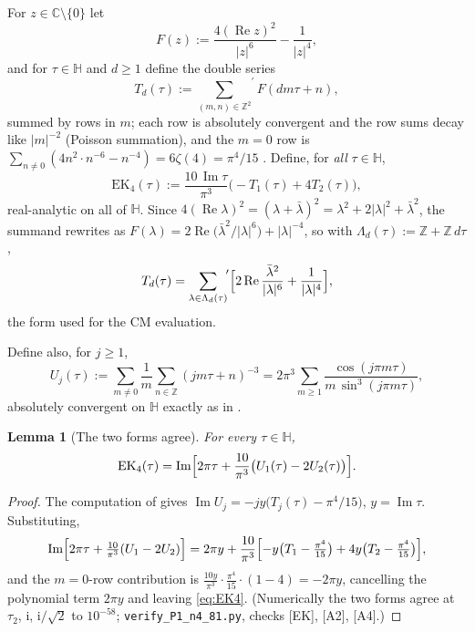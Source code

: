 \documentclass[11pt]{article}
\newtheorem{lemma}[theorem]{Lemma}
\theoremstyle{definition}
\theoremstyle{remark}
\newcommand{\Hh}{\mathbb{H}}
\newcommand{\Cc}{\mathbb{C}}
\newcommand{\Zz}{\mathbb{Z}}
\newcommand{\cL}{\Lambda}
\newcommand{\ii}{\mathrm{i}}
\newcommand{\ImT}{\operatorname{Im}}
\newcommand{\ReT}{\operatorname{Re}}
\begin{document}
For $z\in\Cc\setminus\{0\}$ let
\[
  F(z):=\frac{4(\ReT z)^2}{|z|^6}-\frac1{|z|^4},
\]
and for $\tau\in\Hh$ and $d\ge1$ define the double series
\begin{equation}\label{eq:Td}
  T_d(\tau):={\sum_{(m,n)\in\Zz^2}}^{\!\prime}F(dm\tau+n),
\end{equation}
summed by rows in $m$; each row is absolutely convergent and the row
sums decay like $|m|^{-2}$ (Poisson summation), and the $m=0$ row is
$\sum_{n\neq0}(4n^2\cdot n^{-6}-n^{-4})=6\zeta(4)=\pi^4/15$
\cite[\S2.4]{Zf}. Define, for \emph{all} $\tau\in\Hh$,
\begin{equation}\label{eq:EK4}
  \mathrm{EK}_4(\tau):=\frac{10\,\ImT\tau}{\pi^3}
  \bigl(-T_1(\tau)+4T_2(\tau)\bigr),
\end{equation}
real-analytic on all of $\Hh$. Since
$4(\ReT\lambda)^2=(\lambda+\bar\lambda)^2=\lambda^2+2|\lambda|^2+\bar\lambda^2$,
the summand rewrites as
$F(\lambda)=2\ReT\bigl(\bar\lambda^2/|\lambda|^6\bigr)+|\lambda|^{-4}$,
so with $\cL_d(\tau):=\Zz+\Zz\,d\tau$,
\begin{equation}\label{eq:Talt}
  T_d(\tau)={\sum_{\lambda\in\cL_d(\tau)}}^{\!\prime}
  \Bigl[2\ReT\frac{\bar\lambda^2}{|\lambda|^6}+\frac1{|\lambda|^4}\Bigr],
\end{equation}
the form used for the CM evaluation.

Define also, for $j\ge1$,
\[
  U_j(\tau):=\sum_{m\neq0}\frac1m\sum_{n\in\Zz}(jm\tau+n)^{-3}
  =2\pi^3\sum_{m\ge1}\frac{\cos(j\pi m\tau)}{m\,\sin^3(j\pi m\tau)},
\]
absolutely convergent on $\Hh$ exactly as in \cite[\S2.4]{Zf}.

\begin{lemma}[The two forms agree]\label{lem:twoforms}
For every $\tau\in\Hh$,
\begin{equation}\label{eq:EK4U}
  \mathrm{EK}_4(\tau)
  =\ImT\Bigl[2\pi\tau+\frac{10}{\pi^3}\bigl(U_1(\tau)-2U_2(\tau)\bigr)\Bigr].
\end{equation}
\end{lemma}
\begin{proof}
The computation of \cite[Lemma (key identity)]{Zf} gives
$\ImT U_j=-jy\bigl(T_j(\tau)-\pi^4/15\bigr)$, $y=\ImT\tau$. Substituting,
\[
  \ImT\Bigl[2\pi\tau+\tfrac{10}{\pi^3}(U_1-2U_2)\Bigr]
  =2\pi y+\frac{10}{\pi^3}\Bigl[-y\bigl(T_1-\tfrac{\pi^4}{15}\bigr)
   +4y\bigl(T_2-\tfrac{\pi^4}{15}\bigr)\Bigr],
\]
and the $m=0$-row contribution is
$\frac{10y}{\pi^3}\cdot\frac{\pi^4}{15}\cdot(1-4)=-2\pi y$, cancelling
the polynomial term $2\pi y$ and leaving \eqref{eq:EK4}. (Numerically
the two forms agree at $\tau_2$, $\ii$, $\ii/\sqrt2$ to $10^{-58}$;
\texttt{verify\_P1\_n4\_81.py}, checks [EK], [A2], [A4].)
\end{proof}
\end{document}
